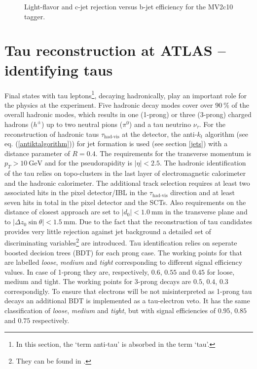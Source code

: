 \begin{figure}
\begin{subfigure}[t]{0.49\textwidth}
  \end{subfigure}
 \caption[Light-flavor (a) and c-jet rejection (b) versus b-jet efficiency for the MV2c10 tagger.]{Light-flavor and c-jet rejection versus b-jet efficiency for the MV2c10 tagger. \cite{MV2c10}}
 \label{btageff}
\end{figure}
\section{Tau reconstruction at ATLAS -- identifying taus}\label{taus}
Final states with tau leptons\footnote{In this section, the `term anti-tau' is absorbed in the term `tau'.}, decaying hadronically, play an important role for the physics at the {\ATLAS} experiment.  Five hadronic decay modes cover over $\SI{90}{\percent}$ of the overall hadronic modes, which results in one (1-prong) or three (3-prong) charged hadrons ($h^\pm$) up to two neutral pions ($\pi^0$) and a tau neutrino $\nu_\tau$. \cite{tauPerformance2} 
For the reconstruction of hadronic taus $\tau_\text{had-vis}$ at the {\ATLAS} detector, the anti-$k_t$ algorithm (see eq. (\ref{antiktalgorithm})) for jet formation is used (see section \ref{jets}) with a distance parameter of $R=0.4$. The requirements for the transverse momentum is $p_T>\SI{10}{\giga\electronvolt}$ and for the pseudorapidity is $|\eta|<2.5$. The hadronic identification of the tau relies on topo-clusters in the last layer of electromagnetic calorimeter and the hadronic calorimeter. The additional track selection requires at least two associated hits in the pixel detector/IBL in the $\tau_\text{had-vis}$ direction and at least seven hits in total in the pixel detector and the SCTs. Also requirements on the distance of closest approach are set to $|d_0|<\SI{1.0}{\milli\meter}$ in the transverse plane and to $|\Delta z_0\sin\theta|<\SI{1.5}{\milli\meter}$.\cite{tauPerformance}\newline
Due to the fact that the reconstruction of tau candidates provides very little rejection against jet background a detailed set of discriminating variables\footnote{They can be found in \cite{tauPerformance}.} are introduced. Tau identification relies on seperate boosted decision trees (BDT) for each prong case. The working points for that are labelled \textit{loose}, \textit{medium} and \textit{tight} corresponding to different signal efficiency values. In case of 1-prong they are, respectively, $0.6$, $0.55$ and $0.45$ for loose, medium and tight. The working points for 3-prong decays are $0.5$, $0.4$, $0.3$ correspondigly. \cite{tauPerformance}\newline
To ensure that electrons will be not misinterpreted as 1-prong tau decays an additional BDT is implemented as a tau-electron veto. It has the same classification of \textit{loose}, \textit{medium} and \textit{tight}, but with signal efficiencies of $0.95$, $0.85$ and $0.75$ respectively. \cite{elBDT}
%
%
